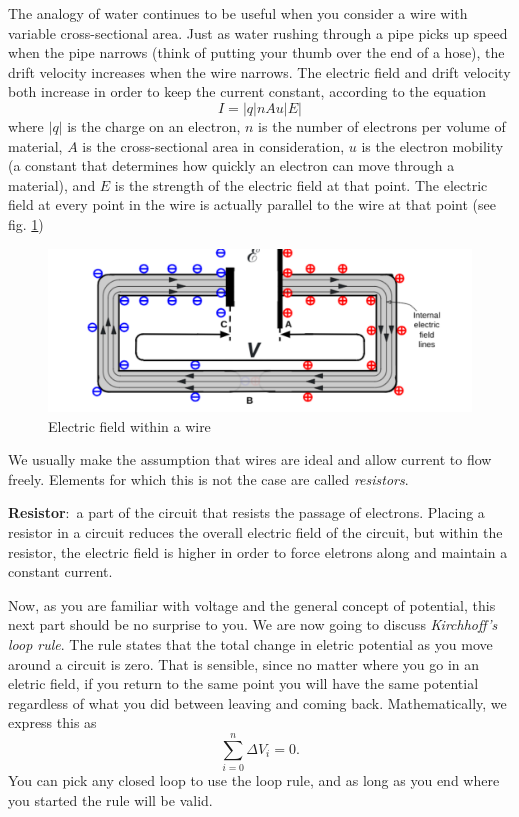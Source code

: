 \documentclass[nobib]{tufte-handout}
\newcommand{\defn}[2]{\noindent\textbf{#1}:\ #2}
\begin{document}
The analogy of water continues to be useful when you consider a wire with variable 
cross-sectional area. Just as water rushing through a pipe picks up speed when the pipe 
narrows (think of putting your thumb over the end of a hose), the drift velocity
increases when the wire narrows. 
The electric field and drift velocity both increase in order to keep 
the current constant, according to the equation 
\[I = |q|nAu|E|\]
where $|q|$ is the charge on an electron, $n$ is the number of electrons per 
volume of material, $A$ is the cross-sectional area in consideration, 
$u$ is the electron mobility (a constant that determines how quickly 
an electron can move through a material), and $E$ is the strength of the electric field
at that point. The electric field at every point in the wire is actually parallel 
to the wire at that point (see fig. \ref{fig:efww})
\begin{figure}
    \center
    \caption{Electric field within a wire}
    \label{fig:efww}
    \includegraphics{images/eflineswire.png}
\end{figure}

We usually make the assumption that wires
are ideal and allow current to flow 
freely. Elements for which this is not 
the case are called \emph{resistors}. 

\defn{Resistor}{a part of the circuit that resists 
the passage of electrons.}
Placing a resistor in a circuit reduces 
the overall electric field of the circuit, 
but within the resistor, the electric field is higher 
in order to force eletrons along and maintain a 
constant current. 

Now, as you are familiar with voltage and the general
concept of potential, this next part should be no surprise to you.
We are now going to discuss \emph{Kirchhoff's loop rule}. 
The rule states that the total change in eletric potential 
as you move around a circuit is zero. That is sensible, 
since no matter where you go in an eletric field, if you return 
to the same point you will have the same potential 
regardless of what you did between leaving and coming back. 
Mathematically, we express this as 
\[\sum_{i=0}^n \Delta V_i = 0.\]
You can pick any closed loop to use the loop rule, 
and as long as you end where you started the rule will be valid.
\end{document}
